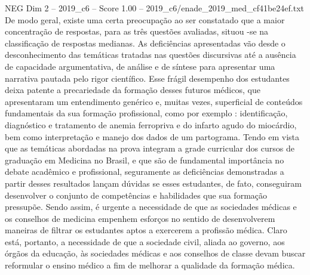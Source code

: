 \begin{textsample}{NEG Dim 2 – 2019\_c6 – Score 1.00 – 2019\_c6/enade\_2019\_med\_cf41be24ef.txt}
De modo geral, existe uma certa preocupação ao ser constatado que a maior concentração de respostas, para as três questões avaliadas, situou -se na classificação de respostas medianas.
As deficiências apresentadas vão desde o desconhecimento das temáticas tratadas nas questões discursivas até a ausência de capacidade argumentativa, de análise e de síntese para apresentar uma narrativa pautada pelo rigor científico.
Esse frágil desempenho dos estudantes deixa patente a precariedade da formação desses futuros médicos, que apresentaram um entendimento genérico e, muitas vezes, superficial de conteúdos fundamentais da sua formação profissional, como por exemplo : identificação, diagnóstico e tratamento de anemia ferropriva e do infarto agudo do miocárdio, bem como interpretação e manejo dos dados de um partograma.
Tendo em vista que as temáticas abordadas na prova integram a grade curricular dos cursos de graduação em Medicina no Brasil, e que são de fundamental importância no debate acadêmico e profissional, seguramente as deficiências demonstradas a partir desses resultados lançam dúvidas se esses estudantes, de fato, conseguiram desenvolver o conjunto de competências e habilidades que sua formação pressupõe.
Sendo assim, é urgente a necessidade de que as sociedades médicas e os conselhos de medicina empenhem esforços no sentido de desenvolverem maneiras de filtrar os estudantes aptos a exercerem a profissão médica.
Claro está, portanto, a necessidade de que a sociedade civil, aliada ao governo, aos órgãos da educação, às sociedades médicas e aos conselhos de classe devam buscar reformular o ensino médico a fim de melhorar a qualidade da formação médica.

\end{textsample}
